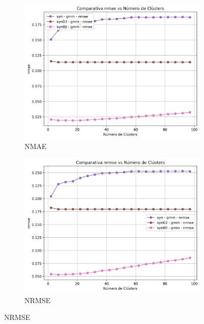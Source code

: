 \documentclass[a4paper,12pt]{report}
\begin{document}
\begin{figure}[H]
    \centering
    \begin{subfigure}[b]{0.49\textwidth}
        \includegraphics[width=\textwidth]{Figuras/nmae-gmm-sin.png}
        \caption{NMAE}
        \label{fig:gmm-clustering-sin-results-a}
    \end{subfigure}
    \hfill
    \begin{subfigure}[b]{0.49\textwidth}
        \includegraphics[width=\textwidth]{Figuras/nrmse-gmm-sin.png}
        \caption{NRMSE}
        \label{fig:gmm-clustering-sin-results-b}
    \end{subfigure}


\end{figure}
\end{document}
